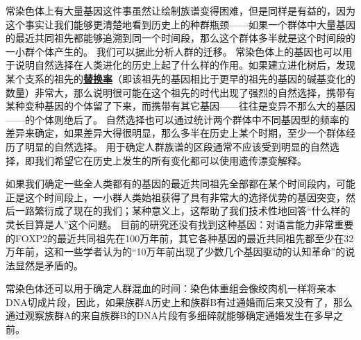 \documentclass[hyperref, UTF8, a4paper, oneside]{ctexart}
\newcommand*{\concept}[1]{\underline{\textbf{#1}}}
\numberwithin{equation}{section}
\begin{document}
常染色体上有大量基因这件事虽然让绘制族谱变得困难，但是同样是有益的，因为这个事实让我们能够更清楚地看到历史上的种群瓶颈——如果一个群体中大量基因的最近共同祖先都能够追溯到同一个时间段，那么这个群体多半就是这个时间段的一小群个体产生的。
我们可以据此分析人群的迁移。
常染色体上的基因也可以用于说明自然选择在人类进化的历史上起了什么样的作用。如果建立进化树后，发现某个支系的祖先的\concept{替换率}（即该祖先的基因相比于更早的祖先的基因的碱基变化的数量）非常大，那么说明很可能在这个祖先的时代出现了强烈的自然选择，携带有某种变种基因的个体留了下来，而携带有其它基因——往往是变异不那么大的基因——的个体则绝后了。
自然选择也可以通过统计两个群体中不同基因型的频率的差异来确定，如果差异大得很明显，那么多半在历史上某个时期，至少一个群体经历了明显的自然选择。
用于确定人群族谱的区段通常不应该受到明显的自然选择，即我们希望它在历史上发生的所有变化都可以使用遗传漂变解释。

如果我们确定一些全人类都有的基因的最近共同祖先全部都在某个时间段内，可能正是这个时间段上，一小群人类始祖获得了具有非常大的选择优势的基因突变，然后一路繁衍成了现在的我们；某种意义上，这帮助了我们技术性地回答“什么样的灵长目算是人”这个问题。
目前的研究还没有找到这种基因：对语言能力非常重要的FOXP2的最近共同祖先在100万年前，其它各种基因的最近共同祖先都至少在32万年前，这和一些学者认为的“10万年前出现了少数几个基因驱动的认知革命”的说法显然是矛盾的。

常染色体还可以用于确定人群混血的时间：染色体重组会像绞肉机一样将亲本DNA切成片段，因此，如果族群A历史上和族群B有过通婚而后来又没有了，那么通过观察族群A的来自族群B的DNA片段有多细碎就能够确定通婚发生在多早之前。
\end{document}
